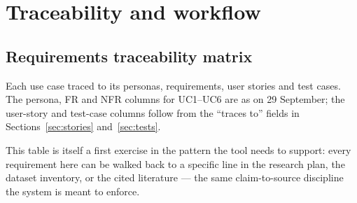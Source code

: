 \section{Traceability and workflow}\label{sec:trace}

\subsection{Requirements traceability matrix}

Each use case traced to its personas, requirements, user stories and test cases. The persona, FR and NFR columns for UC1--UC6 are as on 29 September; the user-story and test-case columns follow from the ``traces to'' fields in Sections~\ref{sec:stories} and~\ref{sec:tests}.

This table is itself a first exercise in the pattern the tool needs to support: every requirement here can be walked back to a specific line in the research plan, the dataset inventory, or the cited literature --- the same claim-to-source discipline the system is meant to enforce.

